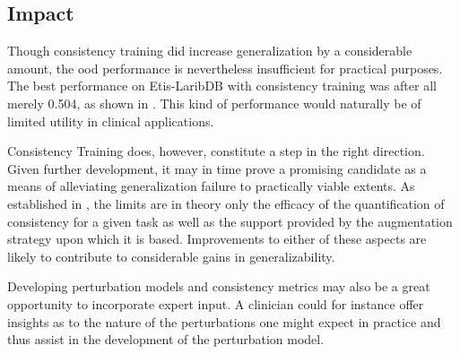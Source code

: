 

        
    \subsection{Impact}
    Though consistency training did increase generalization by a considerable amount, the \gls{ood} performance is nevertheless insufficient for practical purposes. The best performance on Etis-LaribDB with consistency training was after all merely 0.504, as shown in . This kind of performance would naturally be of limited utility in clinical applications. 
    
    Consistency Training does, however, constitute a step in the right direction. Given further development, it may in time prove a promising candidate as a means of alleviating generalization failure to practically viable extents. As established in , the limits are in theory only the efficacy of the quantification of consistency for a given task as well as the support provided by the augmentation strategy upon which it is based. Improvements to either of these aspects are likely to contribute to considerable gains in generalizability. 
    
    Developing perturbation models and consistency metrics may also be a great opportunity to incorporate expert input. A clinician could for instance offer insights as to the nature of the perturbations one might expect in practice and thus assist in the development of the perturbation model.
    
    

